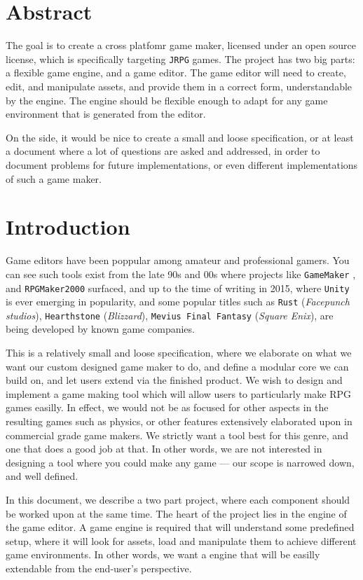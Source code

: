 \section{Abstract}

The goal is to create a cross platfomr game maker, licensed under an open source
license, which is specifically targeting \texttt{JRPG} games.  The project has
two big parts: a flexible game engine, and a game editor. The game editor will
need to create, edit, and manipulate assets, and provide them in a correct form,
understandable by the engine. The engine should be flexible enough to adapt for
any game environment that is generated from the editor.

On the side, it would be nice to create a small and loose specification, or at
least a document where a lot of questions are asked and addressed, in order to
document problems for future implementations, or even different implementations
of such a game maker.

\section{Introduction}

Game editors have been poppular among amateur and professional gamers. You can
see such tools exist from the late 90s and 00s where projects like
\texttt{GameMaker} \cite{gamemaker}, and \texttt{RPGMaker2000}
\cite{rpgmaker2000} surfaced, and up to the time of writing in 2015, where
\texttt{Unity} is ever emerging in popularity, and some popular titles such as
\texttt{Rust} (\textit{Facepunch studios}), \texttt{Hearthstone}
(\textit{Blizzard}), \texttt{Mevius Final Fantasy} (\textit{Square Enix}), are
being developed by known game companies.

This is a relatively small and loose specification, where we elaborate on what
we want our custom designed game maker to do, and define a modular core we can
build on, and let users extend via the finished product. We wish to design and
implement a game making tool which will allow users to particularly make RPG
games easilly. In effect, we would not be as focused for other aspects in the
resulting games such as physics, or other features extensively elaborated upon
in commercial grade game makers. We strictly want a tool best for this genre,
and one that does a good job at that. In other words, we are not interested in
designing a tool where you could make any game --- our scope is narrowed down,
and well defined.

In this document, we describe a two part project, where each component should be
worked upon at the same time. The heart of the project lies in the engine of the
game editor. A game engine is required that will understand some predefined
setup, where it will look for assets, load and manipulate them to achieve
different game environments. In other words, we want a engine that will be
easilly extendable from the end-user's perspective.


